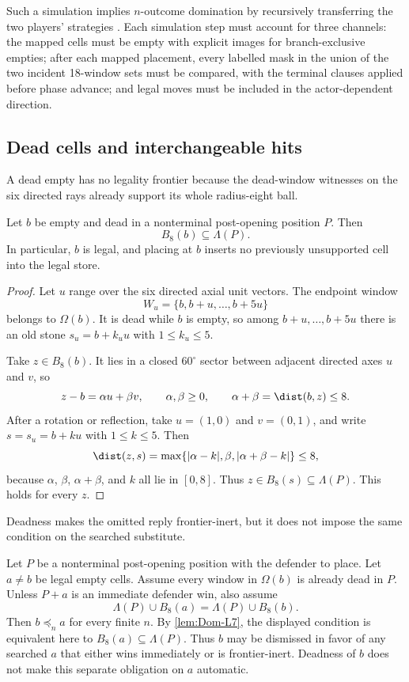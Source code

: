 Such a simulation implies $n$-outcome domination by recursively transferring
the two players' strategies \cite{hexobot-companions}.  Each simulation step
must account for three channels: the mapped cells must be empty with explicit
images for branch-exclusive empties; after each mapped placement, every
labelled mask in the union of the two incident 18-window sets must be compared,
with the terminal clauses applied before phase advance; and legal moves must
be included in the actor-dependent direction.

\subsection{Dead cells and interchangeable hits}

A dead empty has no legality frontier because the dead-window witnesses on
the six directed rays already support its whole radius-eight ball.

\begin{lemma}
\label{lem:Dom-L7}
Let $b$ be empty and dead in a nonterminal post-opening position $P$.  Then
\[
  B_8(b)\subseteq\Lambda(P).
\]
In particular, $b$ is legal, and placing at $b$ inserts no previously
unsupported cell into the legal store.
\end{lemma}

\begin{proof}
Let $u$ range over the six directed axial unit vectors.  The endpoint window
\[
  W_u=\{b,b+u,\ldots,b+5u\}
\]
belongs to $\Omega(b)$.  It is dead while $b$ is empty, so among
$b+u,\ldots,b+5u$ there is an old stone
$s_u=b+k_u u$ with $1\le k_u\le5$.

Take $z\in B_8(b)$.  It lies in a closed $60^\circ$ sector between adjacent
directed axes $u$ and $v$, so
\[
  z-b=\alpha u+\beta v,
  \qquad \alpha,\beta\ge0,
  \qquad \alpha+\beta=\dist(b,z)\le8.
\]
After a rotation or reflection, take $u=(1,0)$ and $v=(0,1)$, and write
$s=s_u=b+ku$ with $1\le k\le5$.  Then
\[
  \dist(z,s)=
  \max\{|\alpha-k|,\beta,|\alpha+\beta-k|\}\le8,
\]
because $\alpha$, $\beta$, $\alpha+\beta$, and $k$ all lie in $[0,8]$.
Thus $z\in B_8(s)\subseteq\Lambda(P)$.  This holds for every $z$.
\end{proof}

Deadness makes the omitted reply frontier-inert, but it does not impose the
same condition on the searched substitute.

\begin{proposition}
\label{prop:Dom-P1}
Let $P$ be a nonterminal post-opening position with the defender to place.
Let $a\ne b$ be legal empty cells.  Assume every window in $\Omega(b)$ is
already dead in $P$.  Unless $P+a$ is an immediate defender win, also assume
\[
  \Lambda(P)\cup B_8(a)=\Lambda(P)\cup B_8(b).
\]
Then $b\preceq_n a$ for every finite $n$.  By \cref{lem:Dom-L7}, the displayed
condition is equivalent here to $B_8(a)\subseteq\Lambda(P)$.  Thus $b$ may be
dismissed in favor of any searched $a$ that either wins immediately or is
frontier-inert.  Deadness of $b$ does not make this separate obligation on
$a$ automatic.
\end{proposition}

